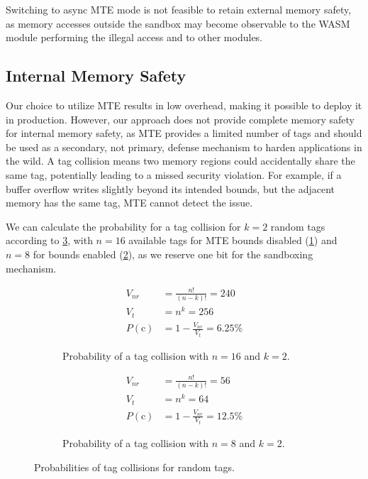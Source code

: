 Switching to async \ac{MTE} mode is not feasible to retain external memory safety, as memory accesses outside the sandbox may become observable to the \ac{WASM} module performing the illegal access and to other modules.

\subsection{Internal Memory Safety}
\label{subsec:sec-guarantees-internal-memory-safety}

Our choice to utilize \ac{MTE} results in low overhead, making it possible to deploy it in production.
However, our approach does not provide complete memory safety for internal memory safety, as \ac{MTE} provides a limited number of tags and should be used as a secondary, not primary, defense mechanism to harden applications in the wild.
A tag collision means two memory regions could accidentally share the same tag, potentially leading to a missed security violation.
For example, if a buffer overflow writes slightly beyond its intended bounds, but the adjacent memory has the same tag, \ac{MTE} cannot detect the issue.

We can calculate the probability for a tag collision for $k=2$ random tags according to \cref{fig:tag-collision}, with $n=16$ available tags for \ac{MTE} bounds disabled (\cref{fig:tag-collision-16}) and $n=8$ for bounds enabled (\cref{fig:tag-collision-8}), as we reserve one bit for the sandboxing mechanism.

\begin{figure}[h]
    \centering
    \begin{subfigure}[T]{0.45\textwidth}
        \centering
        \begin{align*}
            V_{nr} &= \frac{n!}{(n - k)!} = 240 \\
            V_t &= n^k = 256 \\
            P(\text{c}) &= 1 - \frac{V_{nr}}{V_t} = 6.25\%
        \end{align*}
        \caption{Probability of a tag collision with $n=16$ and $k=2$.}
        \label{fig:tag-collision-16}
    \end{subfigure}
    \hfill
    \begin{subfigure}[T]{0.45\textwidth}
        \centering
        \begin{align*}
            V_{nr} &= \frac{n!}{(n - k)!} = 56 \\
            V_t &= n^k = 64 \\
            P(\text{c}) &= 1 - \frac{V_{nr}}{V_t} = 12.5\%
        \end{align*}
        \caption{Probability of a tag collision with $n=8$ and $k=2$.}
        \label{fig:tag-collision-8}
    \end{subfigure}
    \caption{Probabilities of tag collisions for random tags.}
    \label{fig:tag-collision}
\end{figure}

